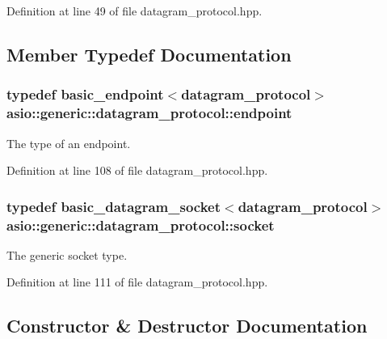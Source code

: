 Definition at line 49 of file datagram\+\_\+protocol.\+hpp.



\subsection{Member Typedef Documentation}
\hypertarget{classasio_1_1generic_1_1datagram__protocol_aa369f433faf2396705f94f287ae080b1}{}
\subsubsection[{endpoint}]{\setlength{\rightskip}{0pt plus 5cm}typedef {\bf basic\+\_\+endpoint}$<${\bf datagram\+\_\+protocol}$>$ {\bf asio\+::generic\+::datagram\+\_\+protocol\+::endpoint}}\label{classasio_1_1generic_1_1datagram__protocol_aa369f433faf2396705f94f287ae080b1}


The type of an endpoint. 



Definition at line 108 of file datagram\+\_\+protocol.\+hpp.

\hypertarget{classasio_1_1generic_1_1datagram__protocol_ace3933da4ea5583139d643d17042b9f3}{}
\subsubsection[{socket}]{\setlength{\rightskip}{0pt plus 5cm}typedef {\bf basic\+\_\+datagram\+\_\+socket}$<${\bf datagram\+\_\+protocol}$>$ {\bf asio\+::generic\+::datagram\+\_\+protocol\+::socket}}\label{classasio_1_1generic_1_1datagram__protocol_ace3933da4ea5583139d643d17042b9f3}


The generic socket type. 



Definition at line 111 of file datagram\+\_\+protocol.\+hpp.



\subsection{Constructor \& Destructor Documentation}
\hypertarget{classasio_1_1generic_1_1datagram__protocol_aff9518b9e296409e4b1c8a7edb6483e2}{}
